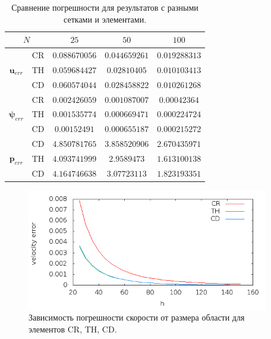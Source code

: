 \documentclass[12pt]{article}
\begin{document}
\begin{table}
    \begin{center}
	\begin{tabular}{|c|c|c|c|c|}
	    \hline	
	    \multicolumn{2}{|c|}{$N$} & $25$ & $50$ & $100$ \\
	    \hline
	    \multirow{3}{*}{$\bm u_{err}$} & CR & $0.088670056$ & $0.044659261$ & $0.019288313$\\
	    
	     & TH & $0.059684427$ & $0.02810405$ & $0.010103413$\\

	     & CD & $0.060574044$ & $0.028458822$ & $0.010261268$\\
	    \hline
	    \multirow{3}{*}{$\bm \psi_{err}$} & CR & $0.002426059$ & $0.001087007$ & $0.00042364$\\
	    
	     & TH & $0.001535774$ & $0.000669471$ & $0.000224724$\\

	     & CD & $0.00152491$ & $0.000655187$ & $0.000215272$\\
	    \hline
	    \multirow{3}{*}{$\bm p_{err}$} & CD & $4.850781765$ & $3.858520906$ & $2.670435971$\\
	    
	     & TH & $4.093741999$ & $2.9589473$ & $1.613100138$\\

	     & CD & $4.164746638$ & $3.07723113$ & $1.823193351$\\
        \hline	    
	\end{tabular}	
	\caption{Сравнение погрешности для результатов с разными сетками и элементами.}
	\label{tb:err}	 
	\end{center}
\end{table}	

\begin{figure}
	\begin{center}
		\includegraphics[width=400px]{pics/u_err}
		\caption{Зависимость погрешности скорости от размера области для элементов CR, TH, CD.}
		\label{fg:u_err}
	\end{center}
\end{figure}
\end{document}
